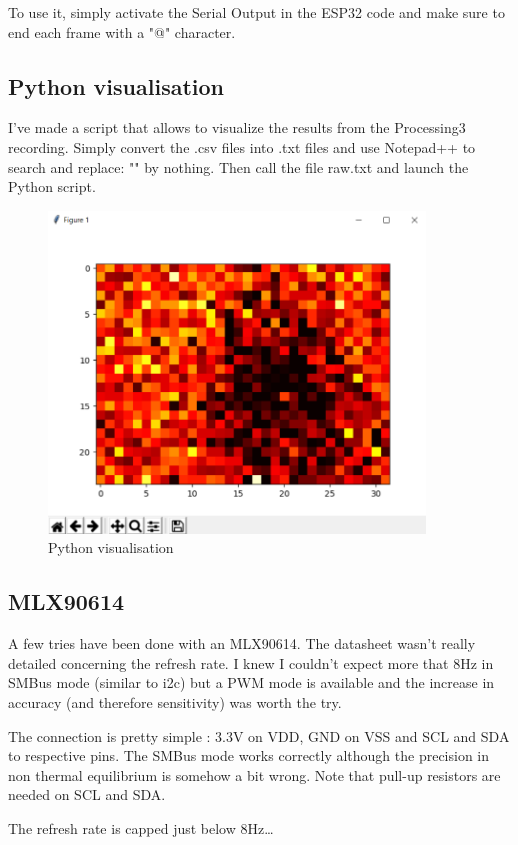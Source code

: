 \documentclass[a4paper]{article}
\begin{document}
To use it, simply activate the Serial Output in the ESP32 code and make sure to end each frame with a "@" character.  

\subsection{Python visualisation}
I've made a script that allows to visualize the results from the Processing3 recording. Simply convert the .csv files into .txt files and use Notepad++ to search and replace: "" by nothing. Then call the file raw.txt and launch the Python script.

\begin{figure}[h!]
    \centering
    \includegraphics[width = 10cm]{images/python.PNG}
    \caption{Python visualisation}
    \label{fig:python}
\end{figure}


\subsection{MLX90614}
A few tries have been done with an MLX90614.
The datasheet wasn’t really detailed concerning the refresh rate. I knew I couldn't expect more that 8Hz in SMBus mode (similar to i2c) but a PWM mode is available and the increase in accuracy (and therefore sensitivity) was worth the try.

The connection is pretty simple : 3.3V on VDD, GND on VSS and SCL and SDA to respective pins. The SMBus mode works correctly although the precision in non thermal equilibrium is somehow a bit wrong.
Note that pull-up resistors are needed on SCL and SDA.

The refresh rate is capped just below 8Hz…
\end{document}
